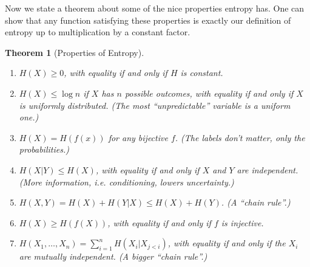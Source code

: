 \documentclass[11pt,letterpaper]{article}
\theoremstyle{plain}
\newtheorem{theorem}{Theorem}
\theoremstyle{definition}
\begin{document}
\noindent Now we state a theorem about some of the nice properties entropy has. One can show that any function satisfying these properties is exactly our definition of entropy up to multiplication by a constant factor.
\begin{theorem}[Properties of Entropy]
	\begin{enumerate}
		\item $H(X)\geq 0$, with equality if and only if $H$ is constant. 
		\item $H(X) \leq \log n$ if $X$ has $n$ possible outcomes, with equality if and only if $X$ is uniformly distributed. (The most ``unpredictable'' variable is a uniform one.)
		\item $H(X) = H(f(x))$ for any bijective $f$. (The labels don't matter, only the probabilities.)
		\item $H(X|Y) \leq H(X)$, with equality if and only if $X$ and $Y$ are independent. (More information, i.e. conditioning, lowers uncertainty.)
		\item $H(X,Y) = H(X) + H(Y|X) \leq H(X)+H(Y)$. (A ``chain rule''.)
		\item $H(X) \geq H(f(X))$, with equality if and only if $f$ is injective.
		\item $H(X_1,\ldots, X_n) = \sum_{i=1}^nH(X_i|X_{j<i})$, with equality if and only if the $X_i$ are mutually independent. (A bigger ``chain rule''.)
	\end{enumerate}
\end{theorem}
\end{document}
